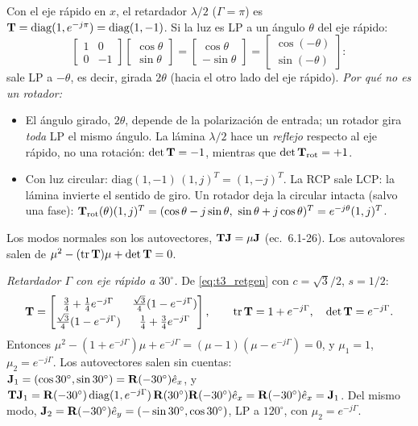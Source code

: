  Con el eje rápido en $x$, el retardador $\lambda/2$ ($\Gamma=\pi$) es
$\mathbf T=\mathrm{diag}(1,e^{-j\pi})=\mathrm{diag}(1,-1)$. Si la luz es LP a un ángulo $\theta$ del eje rápido:
\[
\begin{bmatrix}1&0\\0&-1\end{bmatrix}\begin{bmatrix}\cos\theta\\ \sin\theta\end{bmatrix}
=\begin{bmatrix}\cos\theta\\ -\sin\theta\end{bmatrix}=\begin{bmatrix}\cos(-\theta)\\ \sin(-\theta)\end{bmatrix}:
\]
sale LP a $-\theta$, es decir, girada $2\theta$ (hacia el otro lado del eje rápido).
\emph{Por qué no es un rotador:}
\begin{itemize}
\item El ángulo girado, $2\theta$, depende de la polarización de entrada; un rotador gira
\emph{toda} LP el mismo ángulo. La lámina $\lambda/2$ hace un \emph{reflejo} respecto al eje rápido,
no una rotación: $\det\mathbf T=-1$, mientras que $\det\mathbf T_{\rm rot}=+1$.
\item Con luz circular: $\mathrm{diag}(1,-1)\,(1,j)^T=(1,-j)^T$. La RCP sale LCP: la lámina invierte
el sentido de giro. Un rotador deja la circular intacta (salvo una fase):
$\T_{\rm rot}(\theta)(1,j)^T=(\cos\theta-j\sin\theta,\ \sin\theta+j\cos\theta)^T=e^{-j\theta}(1,j)^T$.
\end{itemize}

 Los modos normales son los autovectores, $\mathbf T\mathbf J=\mu\mathbf J$ (ec.~6.1-26). Los autovalores
salen de $\mu^2-(\mathrm{tr}\,\mathbf T)\mu+\det\mathbf T=0$.

\emph{Retardador $\Gamma$ con eje rápido a $30^\circ$.} De \eqref{eq:t3_retgen} con $c=\sqrt3/2$, $s=1/2$:
\[
\mathbf T=\begin{bmatrix}\frac34+\frac14e^{-j\Gamma} & \frac{\sqrt3}{4}(1-e^{-j\Gamma})\\[2pt]
\frac{\sqrt3}{4}(1-e^{-j\Gamma}) & \frac14+\frac34e^{-j\Gamma}\end{bmatrix},\qquad
\mathrm{tr}\,\mathbf T=1+e^{-j\Gamma},\quad \det\mathbf T=e^{-j\Gamma}.
\]
Entonces $\mu^2-(1+e^{-j\Gamma})\mu+e^{-j\Gamma}=(\mu-1)(\mu-e^{-j\Gamma})=0$, y $\mu_1=1$,
$\mu_2=e^{-j\Gamma}$. Los autovectores salen sin cuentas: $\mathbf J_1=(\cos30^\circ,\sin30^\circ)=\mathbf R(-30^\circ)\hat e_x$, y
$\mathbf T\mathbf J_1=\mathbf R(-30^\circ)\,\mathrm{diag}(1,e^{-j\Gamma})\,\mathbf R(30^\circ)\mathbf R(-30^\circ)\hat e_x=\mathbf R(-30^\circ)\hat e_x=\mathbf J_1$.
Del mismo modo, $\mathbf J_2=\mathbf R(-30^\circ)\hat e_y=(-\sin30^\circ,\cos30^\circ)$, LP a $120^\circ$, con
$\mu_2=e^{-j\Gamma}$.

